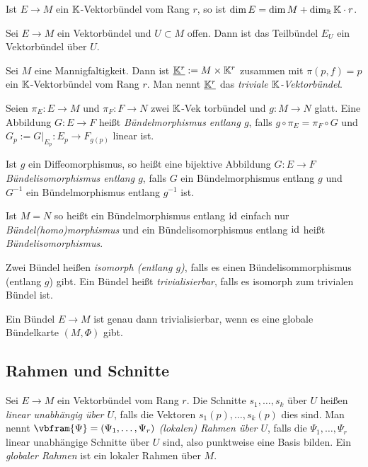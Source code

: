 \begin{proposition}
  Ist $E\to M$ ein $\mathbb{K}$-Vektorbündel vom Rang $r$, so ist $\dim E =
  \dim M + \dim_{\mathbb{R}}\mathbb{K}\cdot r$.
\end{proposition}

\begin{proposition}
  Sei $E\to M$ ein Vektorbündel und $U\subset M$ offen. Dann ist das
  Teilbündel $E_U$ ein Vektorbündel über $U$.
\end{proposition}

\begin{proposition}
  Sei $M$ eine Mannigfaltigkeit. Dann ist $\underline{\mathbb{K}^r} := M\times \mathbb{K}^r$ zusammen mit
  $\pi(p,f) = p$ ein $\mathbb{K}$-Vektorbündel vom Rang $r$. Man nennt
  $\underline{\mathbb{K}^r}$ das \emph{triviale $\mathbb{K}$-Vektorbündel}.
\end{proposition}

\begin{definition}
  Seien $\pi_E\colon E\to M$ und $\pi_F\colon F \to N$ zwei
  $\mathbb{K}$-Vek torbündel und $g\colon M\to N$ glatt. Eine Abbildung
  $G\colon E\to F$ heißt \emph{Bündelmorphismus entlang $g$}, falls
  $g\circ\pi_E = \pi_F\circ G$ und $G_p := G|_{E_p} \colon E_p \to
  F_{g(p)}$ linear ist.

  Ist $g$ ein Diffeomorphismus, so heißt eine bijektive Abbildung $G
  \colon E\to F$ \emph{Bündelisomorphismus
    entlang $g$}, falls $G$ ein Bündelmorphismus entlang $g$ und
  $G^{-1}$ ein Bündelmorphismus entlang $g^{-1}$ ist.

  Ist $M=N$ so heißt ein Bündelmorphismus entlang $\operatorname{id}$ einfach nur
  \emph{Bündel(homo)morphismus} und ein Bündelisomorphismus entlang
  $\operatorname{id}$ heißt \emph{Bündelisomorphismus}.

  Zwei Bündel heißen \emph{isomorph (entlang $g$)}, falls es einen
  Bündelisommorphismus (entlang $g$) gibt. Ein Bündel heißt
  \emph{trivialisierbar}, falls es isomorph zum trivialen Bündel ist.
\end{definition}

\begin{proposition}
  Ein Bündel $E\to M$ ist genau dann trivialisierbar, wenn es eine
  globale Bündelkarte $(M,\Phi)$ gibt.
\end{proposition}

\subsection*{Rahmen und Schnitte}

\begin{definition}
  Sei $E\to M$ ein Vektorbündel vom Rang $r$. Die Schnitte $s_1,\dots,
  s_k$ über $U$ heißen \emph{linear unabhängig über $U$}, falls die
  Vektoren $s_1(p),\dots,s_k(p)$ dies sind. Man nennt $\vbfram{\Psi} =
  (\Psi_1,\dots,\Psi_r)$ \emph{(lokalen) Rahmen über $U$}, falls die
  $\Psi_1,\dots, \Psi_r$ linear unabhängige Schnitte über $U$ sind,
  also punktweise eine Basis bilden. Ein \emph{globaler Rahmen} ist
  ein lokaler Rahmen über $M$. 
\end{definition}

